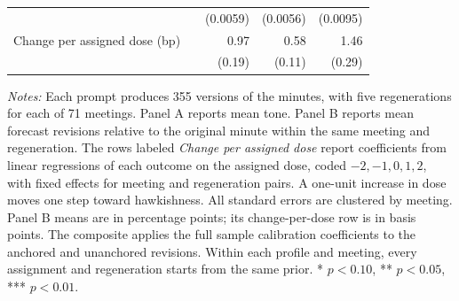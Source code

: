 \begin{table}[htbp]
\begin{threeparttable}
\begin{footnotesize}
\begin{tabular}{lcddd}
 & & (0.0059) & (0.0056) & (0.0095) \\
\addlinespace[0.08cm]
Change per assigned dose (bp) & & 0.97\sym{***} & 0.58\sym{***} & 1.46\sym{***} \\
 & & (0.19) & (0.11) & (0.29) \\
\bottomrule
\end{tabular}
\begin{tablenotes}[flushleft]
\scriptsize
\item \textit{Notes:} Each prompt produces 355 versions of the minutes, with five regenerations for each of 71 meetings. Panel A reports mean tone. Panel B reports mean forecast revisions relative to the original minute within the same meeting and regeneration. The rows labeled \emph{Change per assigned dose} report coefficients from linear regressions of each outcome on the assigned dose, coded $-2,-1,0,1,2$, with fixed effects for meeting and regeneration pairs. A one-unit increase in dose moves one step toward hawkishness. All standard errors are clustered by meeting. Panel B means are in percentage points; its change-per-dose row is in basis points. The composite applies the full sample calibration coefficients to the anchored and unanchored revisions. Within each profile and meeting, every assignment and regeneration starts from the same prior. * $p<0.10$, ** $p<0.05$, *** $p<0.01$.
\end{tablenotes}
\end{footnotesize}
\end{threeparttable}
\end{table}
